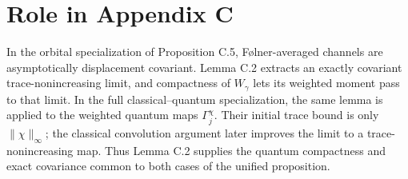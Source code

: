 \documentclass[11pt]{article}
\begin{document}
\section{Role in Appendix C}

In the orbital specialization of Proposition C.5, F\o lner-averaged channels
are asymptotically displacement covariant.  Lemma C.2 extracts an exactly
covariant trace-nonincreasing limit, and compactness of $W_\gamma$ lets its
weighted moment pass to that limit.  In the full classical--quantum
specialization, the same lemma is applied to the weighted quantum maps
$\Gamma_j^\chi$.  Their initial trace bound is only $\|\chi\|_\infty$; the
classical convolution argument later improves the limit to a
trace-nonincreasing map.  Thus Lemma C.2 supplies the quantum compactness and
exact covariance common to both cases of the unified proposition.
\end{document}
